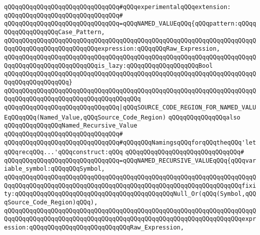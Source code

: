 \verb|qQQqqQQqqQQqqQQqqQQqqQQqqQQqqQQq#qQQqexperimentalqQQqextension:|\newline
\verb|qQQqqQQqqQQqqQQqqQQqqQQqqQQqqQQq#|\newline
\verb|qQQqqQQqqQQqqQQqqQQqqQQqqQQqqQQq=qQQqNAMED_VALUEqQQq{qQQqpattern:qQQqqQQqqQQqqQQqqQQqCase_Pattern,|\newline
\verb|qQQqqQQqqQQqqQQqqQQqqQQqqQQqqQQqqQQqqQQqqQQqqQQqqQQqqQQqqQQqqQQqqQQqqQQqqQQqqQQqqQQqqQQqqQQqqQQqexpression:qQQqqQQqRaw_Expression,|\newline
\verb|qQQqqQQqqQQqqQQqqQQqqQQqqQQqqQQqqQQqqQQqqQQqqQQqqQQqqQQqqQQqqQQqqQQqqQQqqQQqqQQqqQQqqQQqqQQqqQQqis_lazy:qQQqqQQqqQQqqQQqqQQqBool|\newline
\verb|qQQqqQQqqQQqqQQqqQQqqQQqqQQqqQQqqQQqqQQqqQQqqQQqqQQqqQQqqQQqqQQqqQQqqQQqqQQqqQQqqQQqqQQq}|\newline
\verb|qQQqqQQqqQQqqQQqqQQqqQQqqQQqqQQqqQQqqQQqqQQqqQQqqQQqqQQqqQQqqQQqqQQqqQQqqQQqqQQqqQQqqQQqqQQqqQQqqQQqqQQqqQQq|\newline
\newline
\verb|qQQqqQQqqQQqqQQqqQQqqQQqqQQqqQQq|\verb#|qQQqSOURCE_CODE_REGION_FOR_NAMED_VALUEqQQqqQQq(Named_Value,qQQqSource_Code_Region)#\newline
\newline
\newline
\newline
\verb|qQQqqQQqqQQqqQQqalso|\newline
\verb|qQQqqQQqqQQqqQQqNamed_Recursive_Value|\newline
\verb|qQQqqQQqqQQqqQQqqQQqqQQqqQQqqQQq#|\newline
\verb|qQQqqQQqqQQqqQQqqQQqqQQqqQQqqQQq#qQQqqQQqNamingsqQQqforqQQqtheqQQq'letqQQqrecqQQq...'qQQqconstruct:qQQq|\newline
\verb|qQQqqQQqqQQqqQQqqQQqqQQqqQQqqQQq#|\newline
\verb|qQQqqQQqqQQqqQQqqQQqqQQqqQQqqQQq=qQQqNAMED_RECURSIVE_VALUEqQQq{qQQqvariable_symbol:qQQqqQQqSymbol,|\newline
\verb|qQQqqQQqqQQqqQQqqQQqqQQqqQQqqQQqqQQqqQQqqQQqqQQqqQQqqQQqqQQqqQQqqQQqqQQqqQQqqQQqqQQqqQQqqQQqqQQqqQQqqQQqqQQqqQQqqQQqqQQqqQQqqQQqqQQqqQQqfixity:qQQqqQQqqQQqqQQqqQQqqQQqqQQqqQQqqQQqqQQqqQQqNull_Or(qQQq(Symbol,qQQqSource_Code_Region)qQQq),|\newline
\verb|qQQqqQQqqQQqqQQqqQQqqQQqqQQqqQQqqQQqqQQqqQQqqQQqqQQqqQQqqQQqqQQqqQQqqQQqqQQqqQQqqQQqqQQqqQQqqQQqqQQqqQQqqQQqqQQqqQQqqQQqqQQqqQQqqQQqqQQqexpression:qQQqqQQqqQQqqQQqqQQqqQQqqQQqRaw_Expression,|\newline
